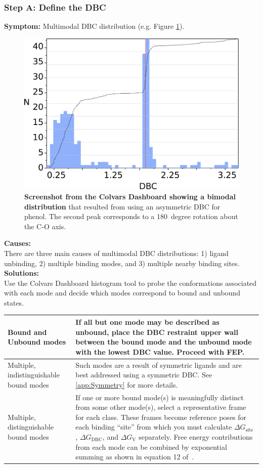 \documentclass[9pt,tutorial]{Styling/livecoms}
\begin{document}
\subsubsection{Step A: Define the DBC}
\noindent\textbf{Symptom:}  Multimodal DBC distribution (e.g. Figure \ref{fig:bimodalDBC}).\\
\begin{figure}[!htb]
    \centering
    \includegraphics[width=0.9\linewidth]{Figures/recropped_bimodal.png}
    \caption{\textbf{Screenshot from the Colvars Dashboard showing a bimodal distribution} that resulted from using an asymmetric DBC for phenol. The second peak corresponds to a 180~degree rotation about the C-O axis.}
    \label{fig:bimodalDBC}
\end{figure}
\noindent\textbf{Causes:}\\
There are three main causes of multimodal DBC distributions: 1) ligand unbinding, 2) multiple binding modes, and 3) multiple nearby binding sites.\\ 
\textbf{Solutions:}\\
Use the Colvars Dashboard histogram tool to probe the conformations associated with each mode and decide which modes correspond to bound and unbound states. \\
\begin{tabular}{|p{3cm}|p{5cm}|}
    \hline
    \center Bound and Unbound modes & If all but one mode may be described as unbound, place the DBC restraint upper wall between the bound mode and the unbound mode with the lowest DBC value. Proceed with FEP. \\\hline
    \center Multiple, indistinguishable bound modes & Such modes are a result of symmetric ligands and are best addressed using a symmetric DBC. See \ref{app:Symmetry} for more details.\\\hline
    \center Multiple, distinguishable bound modes & If one or more bound mode(s) is meaningfully distinct from some other mode(s), select a representative frame for each class. These frames become reference poses for each binding ``site'' from which you must calculate $\Delta G_\mathrm{site}$, $\Delta G_\mathrm{DBC}$, and $\Delta G_\mathrm{V}$ separately. Free energy contributions from each mode can be combined by exponential summing as shown in equation 12 of~\cite{Mobley2006}. \\\hline
\end{tabular}
\end{document}
